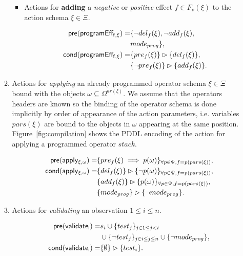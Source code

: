 \documentclass{article}
\newcommand{\pre}{\mathsf{pre}}     %
\newcommand{\cond}{\mathsf{cond}}   %
\begin{document}
\begin{itemize}
\begin{enumerate}
\begin{itemize}
\item Actions for {\bf adding} a {\em negative} or {\em positive} effect $f\in F_v(\xi)$ to the action schema $\xi\in\Xi$.

\begin{small}
\begin{align*}
\hspace*{7pt}\pre(\mathsf{programEff_{f,\xi}})=&\{\neg del_{f}(\xi),\neg add_{f}(\xi),\\
& mode_{prog}\},\\
\cond(\mathsf{programEff_{f,\xi}})=&\{pre_{f}(\xi)\}\rhd\{del_{f}(\xi)\},\\
&\{\neg pre_{f}(\xi)\}\rhd\{add_{f}(\xi)\}.
\end{align*}
\end{small}
\end{itemize}

\item Actions for {\em applying} an already programmed operator schema $\xi\in\Xi$ bound with the objects $\omega\subseteq\Omega^{ar(\xi)}$. We assume that the operators headers are known so the binding of the operator schema is done implicitly by order of appearance of the action parameters, i.e. variables $pars(\xi)$ are bound to the objects in $\omega$ appearing at the same position. Figure~\ref{fig:compilation} shows the PDDL encoding of the action for applying a programmed operator $stack$.
\begin{small}
\begin{align*}
\hspace*{7pt}\pre(\mathsf{apply_{\xi,\omega}})=&\{pre_{f}(\xi)\implies p(\omega)\}_{\forall p\in\Psi,f=p(pars(\xi))},\\
\cond(\mathsf{apply_{\xi,\omega}})=&\{del_{f}(\xi)\}\rhd\{\neg p(\omega)\}_{\forall p\in\Psi,f=p(pars(\xi))},\\
&\{add_{f}(\xi)\}\rhd\{p(\omega)\}_{\forall p\in\Psi,f=p(pars(\xi))},\\
&\{mode_{prog}\}\rhd\{\neg mode_{prog}\}.
\end{align*}
\end{small}

\item Actions for {\em validating} an observation {\tt\small $1\leq i\leq n$}.
\begin{small}
\begin{align*}
\hspace*{7pt}\pre(\mathsf{validate_{i}})=&s_i\cup\{test_j\}_{j\in 1\leq j<i}\\
&\cup\{\neg test_j\}_{j\in i\leq j\leq n}\cup \{\neg mode_{prog}\},\\
\cond(\mathsf{validate_{i}})=&\{\emptyset\}\rhd\{test_i\}.
\end{align*}
\end{small}
\end{enumerate}
\end{itemize}
\end{document}
